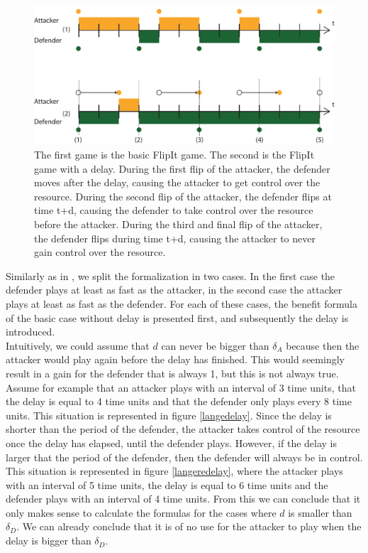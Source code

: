 \begin{figure}[hbtp]
\centering
\includegraphics[scale=0.7]{Images/Delayuitgelegd.pdf}
\caption{The first game is the basic FlipIt game. The second is the FlipIt game with a delay. During the first flip of the attacker, the defender moves after the delay, causing the attacker to get control over the resource. During the second flip of the attacker, the defender flips at time t+d, causing the defender to take control over the resource before the attacker. During the third and final flip of the attacker, the defender flips during time t+d, causing the attacker to never gain control over the resource. }
\label{dt}
\end{figure}

Similarly as in \cite{FlipIt}, we split the formalization in two cases. In the first case the defender plays at least as fast as the attacker, in the second case the attacker plays at least as fast as the defender. For each of these cases, the benefit formula of the basic case without delay is presented first, and subsequently the delay is introduced.  \\

Intuitively, we could assume that $d$ can never be bigger than $\delta_{A}$ because then the attacker would play again before the delay has finished. This would seemingly result in a gain for the defender that is always 1, but this is not always true. Assume for example that an attacker plays with an interval of 3 time units, that the delay is equal to 4 time units and that the defender only plays every 8 time units. This situation is represented in figure \ref{langedelay}. Since the delay is shorter than the period of the defender, the attacker takes control of the resource once the delay has elapsed, until the defender plays. However, if the delay is larger that the period of the defender, then the defender will always be in control. This situation is represented in figure \ref{langeredelay}, where the attacker plays with an interval of 5 time units, the delay is equal to 6 time units and the defender plays with an interval of 4 time units. From this we can conclude that it only makes sense to calculate the formulas for the cases where $d$ is smaller than $\delta_{D}$. We can already conclude that it is of no use for the attacker to play when the delay is bigger than $\delta_{D}$. 




